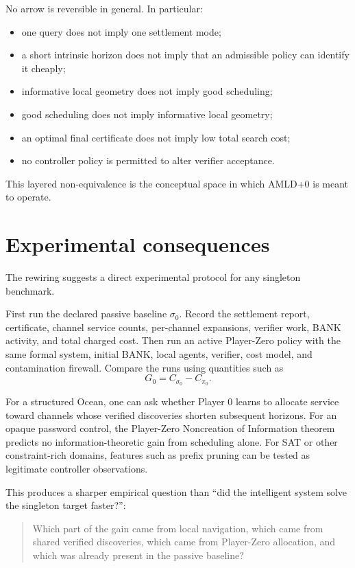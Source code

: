 \documentclass[11pt]{article}
\begin{document}
No arrow is reversible in general.  In particular:
\begin{itemize}
    \item one query does not imply one settlement mode;
    \item a short intrinsic horizon does not imply that an admissible policy
    can identify it cheaply;
    \item informative local geometry does not imply good scheduling;
    \item good scheduling does not imply informative local geometry;
    \item an optimal final certificate does not imply low total search cost;
    \item no controller policy is permitted to alter verifier acceptance.
\end{itemize}

This layered non-equivalence is the conceptual space in which AMLD+0 is meant
to operate.

\section{Experimental consequences}

The rewiring suggests a direct experimental protocol for any singleton
benchmark.

First run the declared passive baseline $\sigma_0$.  Record the settlement
report, certificate, channel service counts, per-channel expansions, verifier
work, BANK activity, and total charged cost.  Then run an active Player-Zero
policy with the same formal system, initial BANK, local agents, verifier, cost
model, and contamination firewall.  Compare the runs using quantities such as
\[
G_0=C_{\sigma_0}-C_{\pi_0}.
\]

For a structured Ocean, one can ask whether Player 0 learns to allocate service
toward channels whose verified discoveries shorten subsequent horizons.  For
an opaque password control, the Player-Zero Noncreation of Information theorem
predicts no information-theoretic gain from scheduling alone.  For SAT or
other constraint-rich domains, features such as prefix pruning can be tested
as legitimate controller observations.

This produces a sharper empirical question than ``did the intelligent system
solve the singleton target faster?'':

\begin{quote}
Which part of the gain came from local navigation, which came from shared
verified discoveries, which came from Player-Zero allocation, and which was
already present in the passive baseline?
\end{quote}
\end{document}
